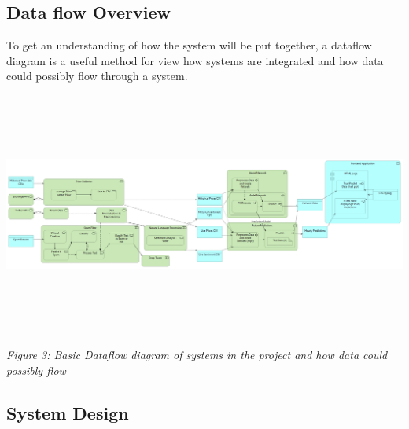 \documentclass[oneside, 12pt]{article}
\begin{document}
			
		\newpage
		
		\subsection{Data flow Overview}\label{data-flow}
		To get an understanding of how the system will be put together, a dataflow diagram is a useful method for view how systems are integrated and how data could possibly flow through a system.
		
		\includegraphics[width=18cm,height=8cm]{images/Generic_Flow.png}
		\begin{center}
			\textit{Figure 3: Basic Dataflow diagram of systems in the project and how data could possibly flow}
		\end{center}
		
	\newpage
	
	\begin{center}	
		\section{System Design}\label{Design}
	\end{center}
\end{document}
